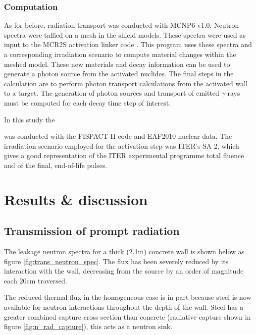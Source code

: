 \subsubsection{Computation}
As for before, radiation transport was conducted with MCNP6 v1.0. Neutron spectra were tallied on a mesh in the shield models. These spectra were used as input to the MCR2S activation linker code \cite{Eade2015}. This program uses these spectra and a corresponding irradiation scenario to compute material changes within the meshed model. These new materials and decay information can be used to generate a photon source from the activated nuclides. The final steps in the calculation are to perform photon transport calculations from the activated wall to a target. The generation of photon sources and transport of emitted $\gamma$-rays must be computed for each decay time step of interest.

In this study the 

was conducted with the FISPACT-II code and EAF2010 nuclear data. The irradiation scenario employed for the activation step was ITER's SA-2, which gives a good representation of the ITER experimental programme total fluence and of the final, end-of-life pulses.


\section{Results \& discussion}

\subsection{Transmission of prompt radiation}
\label{subsec:prompt}
The leakage neutron spectra for a thick (2.1m) concrete wall is shown below as figure \ref{fig:trans_neutron_spec}. The flux has been severely reduced by its interaction with the wall, decreasing from the source by an order of magnitude each 20cm traversed.\par
The reduced thermal flux in the homogeneous case is in part because steel is now available for neutron interactions throughout the depth of the wall. Steel has a greater combined capture cross-section than concrete (radiative capture shown in figure \ref{fig:n_rad_capture}), this acts as a neutron sink. 


